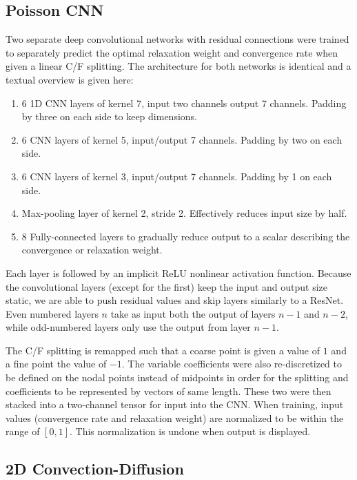 \documentclass[review]{siamart190516}
\begin{document}
\subsection{Poisson CNN}\label{subsec:poisson_cnn}

Two separate deep convolutional networks with residual connections were trained to separately predict the optimal relaxation weight and convergence rate when given a linear C/F splitting.  The architecture for both networks is identical and a textual overview is given here:

\begin{enumerate}
\item 6 1D CNN layers of kernel 7, input two channels output 7 channels.  Padding by three on each side to keep dimensions.
\item 6 CNN layers of kernel 5, input/output 7 channels.  Padding by two on each side.
\item 6 CNN layers of kernel 3, input/output 7 channels.  Padding by 1 on each side.
\item Max-pooling layer of kernel 2, stride 2.  Effectively reduces input size by half.
\item 8 Fully-connected layers to gradually reduce output to a scalar describing the convergence or relaxation weight.
\end{enumerate}

Each layer is followed by an implicit ReLU nonlinear activation function.  Because the convolutional layers (except for the first) keep the input and output size static, we are able to push residual values and skip layers similarly to a ResNet.  Even numbered layers $n$ take as input both the output of layers $n-1$ and $n-2$, while odd-numbered layers only use the output from layer $n-1$.

The C/F splitting is remapped such that a coarse point is given a value of $1$ and a fine point the value of $-1$.  The variable coefficients were also re-discretized to be defined on the nodal points instead of midpoints in order for the splitting and coefficients to be represented by vectors of same length.  These two were then stacked into a two-channel tensor for input into the CNN.  When training, input values (convergence rate and relaxation weight) are normalized to be within the range of $\left[0,1\right]$.  This normalization is undone when output is displayed.

\subsection{2D Convection-Diffusion}\label{subsec:methods_conv}
\end{document}
